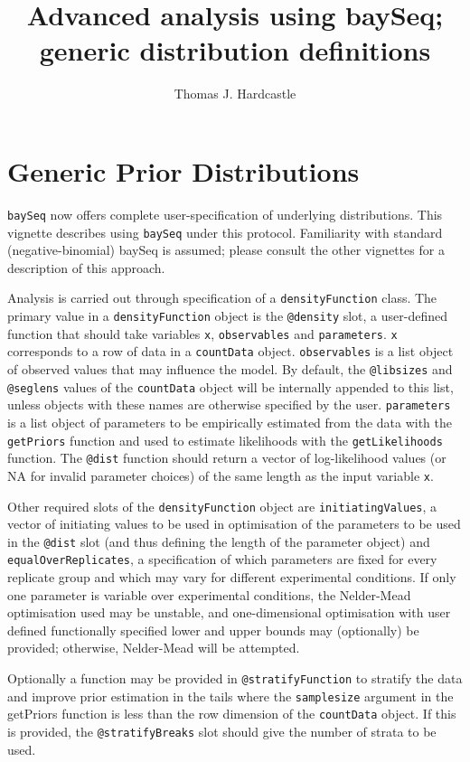 \documentclass[a4paper]{article}
\title{Advanced analysis using baySeq; generic distribution definitions}
\author{Thomas J. Hardcastle}
\begin{document}
\maketitle

\section{Generic Prior Distributions}

\verb'baySeq' now offers complete user-specification of underlying distributions. This vignette describes using \verb'baySeq' under this protocol. Familiarity with standard (negative-binomial) baySeq is assumed; please consult the other vignettes for a description of this approach.

Analysis is carried out through specification of a \verb'densityFunction' class. The primary value in a \verb'densityFunction' object is the \verb'@density' slot, a user-defined function that should take variables \verb'x', \verb'observables' and \verb'parameters'. \verb'x' corresponds to a row of data in a \verb'countData' object. \verb'observables' is  a list object of observed values that may influence the model. By default, the \verb'@libsizes' and \verb'@seglens' values of the \verb'countData' object will be internally appended to this list, unless objects with these names are otherwise specified by the user. \verb'parameters' is a list object of parameters to be empirically estimated from the data with the \verb'getPriors' function and used to estimate likelihoods with the \verb'getLikelihoods' function. The \verb'@dist' function should return a vector of log-likelihood values (or NA for invalid parameter choices) of the same length as the input variable \verb'x'.

Other required slots of the \verb'densityFunction' object are \verb'initiatingValues', a vector of initiating values to be used in optimisation of the parameters to be used in the \verb'@dist' slot (and thus defining the length of the parameter object) and \verb'equalOverReplicates', a specification of which parameters are fixed for every replicate group and which may vary for different experimental conditions. If only one parameter is variable over experimental conditions, the Nelder-Mead optimisation used may be unstable, and one-dimensional optimisation with user defined functionally specified lower and upper bounds may (optionally) be provided; otherwise, Nelder-Mead will be attempted. 

Optionally a function may be provided in \verb'@stratifyFunction' to stratify the data and improve prior estimation in the tails where the \verb'samplesize' argument in the getPriors function is less than the row dimension of the \verb'countData' object. If this is provided, the \verb'@stratifyBreaks' slot should give the number of strata to be used.
\end{document}
